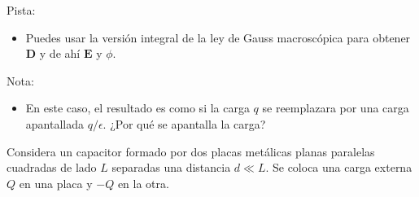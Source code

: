 \documentclass{exam}
\begin{document}
\begin{questions}
  Pista:
  \begin{itemize}
  \item Puedes usar la versión integral de la ley de Gauss
    macroscópica para
    obtener $\bm D$ y de ahí $\bm E$ y $\phi$.
  \end{itemize}
  Nota:
  \begin{itemize}
  \item En este caso, el resultado es como si la carga $q$ se
    reemplazara por una carga apantallada $q/\epsilon$. ¿Por qué se
    apantalla la carga?
  \end{itemize}
  \question Considera un capacitor formado por dos placas metálicas planas
  paralelas cuadradas de lado $L$ separadas una distancia $d\ll L$. Se
  coloca una carga externa $Q$ en una placa y $-Q$ en la otra.
  \begin{parts}

\end{parts}
\end{questions}
\end{document}
